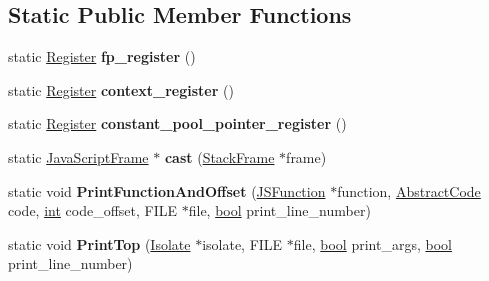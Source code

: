 \subsection*{Static Public Member Functions}
\begin{DoxyCompactItemize}
\item 
\mbox{\label{classv8_1_1internal_1_1JavaScriptFrame_aeac2817ca9aa85228525437bb63ba93a}} 
static \mbox{\hyperlink{classv8_1_1internal_1_1Register}{Register}} {\bfseries fp\+\_\+register} ()
\item 
\mbox{\label{classv8_1_1internal_1_1JavaScriptFrame_a9e00a6dd7a2c9facca672c58dbc71df6}} 
static \mbox{\hyperlink{classv8_1_1internal_1_1Register}{Register}} {\bfseries context\+\_\+register} ()
\item 
\mbox{\label{classv8_1_1internal_1_1JavaScriptFrame_af5bce3abfebd253e22d34c5f2e6a14ff}} 
static \mbox{\hyperlink{classv8_1_1internal_1_1Register}{Register}} {\bfseries constant\+\_\+pool\+\_\+pointer\+\_\+register} ()
\item 
\mbox{\label{classv8_1_1internal_1_1JavaScriptFrame_ac66e5118c1b57fd1508b201694cd7d54}} 
static \mbox{\hyperlink{classv8_1_1internal_1_1JavaScriptFrame}{Java\+Script\+Frame}} $\ast$ {\bfseries cast} (\mbox{\hyperlink{classv8_1_1internal_1_1StackFrame}{Stack\+Frame}} $\ast$frame)
\item 
\mbox{\label{classv8_1_1internal_1_1JavaScriptFrame_ace490fcc362923d5a310299cd07c2024}} 
static void {\bfseries Print\+Function\+And\+Offset} (\mbox{\hyperlink{classv8_1_1internal_1_1JSFunction}{J\+S\+Function}} $\ast$function, \mbox{\hyperlink{classv8_1_1internal_1_1AbstractCode}{Abstract\+Code}} code, \mbox{\hyperlink{classint}{int}} code\+\_\+offset, F\+I\+LE $\ast$file, \mbox{\hyperlink{classbool}{bool}} print\+\_\+line\+\_\+number)
\item 
\mbox{\label{classv8_1_1internal_1_1JavaScriptFrame_a69de8494527b217bfd2bcde82196cd31}} 
static void {\bfseries Print\+Top} (\mbox{\hyperlink{classv8_1_1internal_1_1Isolate}{Isolate}} $\ast$isolate, F\+I\+LE $\ast$file, \mbox{\hyperlink{classbool}{bool}} print\+\_\+args, \mbox{\hyperlink{classbool}{bool}} print\+\_\+line\+\_\+number)

\end{DoxyCompactItemize}
